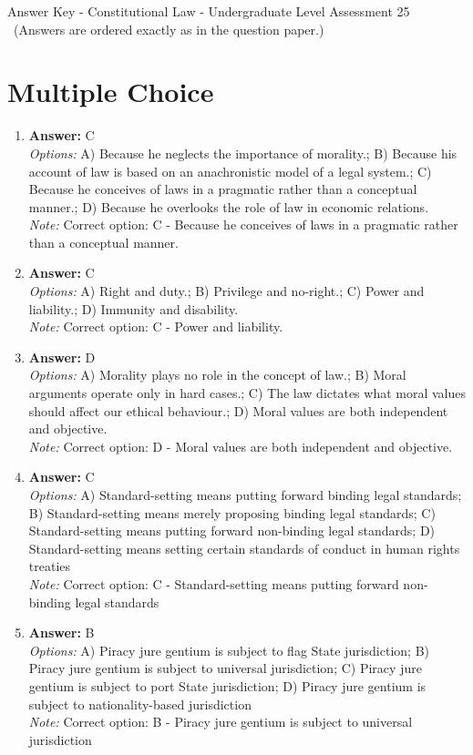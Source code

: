 \documentclass[12pt]{article}
\begin{document}
\begin{center}
Answer Key - Constitutional Law - Undergraduate Level Assessment 25 \
\small (Answers are ordered exactly as in the question paper.)
\end{center}

\section*{Multiple Choice}
\begin{enumerate}[label=\arabic*.]
\item \textbf{Answer:} C
\\ \textit{Options:} A) Because he neglects the importance of morality.; B) Because his account of law is based on an anachronistic model of a legal system.; C) Because he conceives of laws in a pragmatic rather than a conceptual manner.; D) Because he overlooks the role of law in economic relations.
\\ \textit{Note:} Correct option: C - Because he conceives of laws in a pragmatic rather than a conceptual manner.
\item \textbf{Answer:} C
\\ \textit{Options:} A) Right and duty.; B) Privilege and no-right.; C) Power and liability.; D) Immunity and disability.
\\ \textit{Note:} Correct option: C - Power and liability.
\item \textbf{Answer:} D
\\ \textit{Options:} A) Morality plays no role in the concept of law.; B) Moral arguments operate only in hard cases.; C) The law dictates what moral values should affect our ethical behaviour.; D) Moral values are both independent and objective.
\\ \textit{Note:} Correct option: D - Moral values are both independent and objective.
\item \textbf{Answer:} C
\\ \textit{Options:} A) Standard-setting means putting forward binding legal standards; B) Standard-setting means merely proposing binding legal standards; C) Standard-setting means putting forward non-binding legal standards; D) Standard-setting means setting certain standards of conduct in human rights treaties
\\ \textit{Note:} Correct option: C - Standard-setting means putting forward non-binding legal standards
\item \textbf{Answer:} B
\\ \textit{Options:} A) Piracy jure gentium is subject to flag State jurisdiction; B) Piracy jure gentium is subject to universal jurisdiction; C) Piracy jure gentium is subject to port State jurisdiction; D) Piracy jure gentium is subject to nationality-based jurisdiction
\\ \textit{Note:} Correct option: B - Piracy jure gentium is subject to universal jurisdiction
\end{enumerate}
\end{document}

